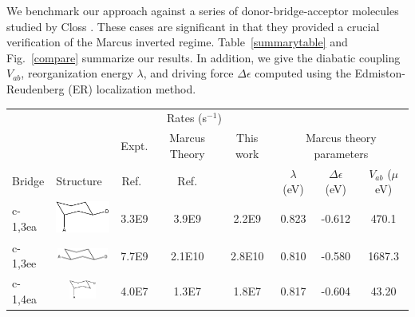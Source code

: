  We  benchmark our approach against a series of donor-bridge-acceptor
molecules studied by Closs \cite{closs1988determination,closs1988intramolecular,closs1989connection}.
These cases are significant in that they provided a crucial verification of the Marcus inverted regime.
Table~\ref{summarytable} and Fig.~\ref{compare}  summarize our results.
In addition, we give the diabatic coupling $V_{ab}$, reorganization energy $\lambda$, and driving force $\Delta \epsilon$
computed using the Edmiston-Reudenberg (ER) localization method.

\begin{table}
\begin{centering}
\begin{tabular}{llccc|ccc}
\hline \hline
 & & \multicolumn{3}{c}{Rates (s$^{-1}$) }& \\
                &                                                                &   Expt.                 &        Marcus Theory   & This work      & \multicolumn{3}{c}{Marcus theory parameters} \\
 Bridge   &  Structure                                                &        Ref.~\cite{closs1988determination,closs1989connection} &              Ref. \cite{subotnik2010predicting}  &                  &      $\lambda$ (eV)  &  $\Delta \epsilon$ (eV)  &  $V_{ab}$ ($\mu$eV) \\
\hline
 c-1,3ea  &  \includegraphics[height=.60cm,width=2cm]{Chapters/chap2/Table1-c13ea.pdf}  &                     3.3E9  &                     3.9E9  &          2.2E9  &           0.823  &           -0.612  &      470.1  \\
\hline
 c-1,3ee  &  \includegraphics[height=0.4cm,width=2cm]{Chapters/chap2/Table1-c13ee.pdf}  &                     7.7E9  &                    2.1E10  &         2.8E10  &           0.810  &           -0.580  &     1687.3  \\
\hline
 c-1,4ea  &  \includegraphics[height=0.6cm,width=2cm]{Chapters/chap2/Table1-c14ea.pdf}  &                     4.0E7  &                     1.3E7  &          1.8E7  &           0.817  &           -0.604  &      43.20 \\

\end{tabular}
\end{centering}
\end{table}
